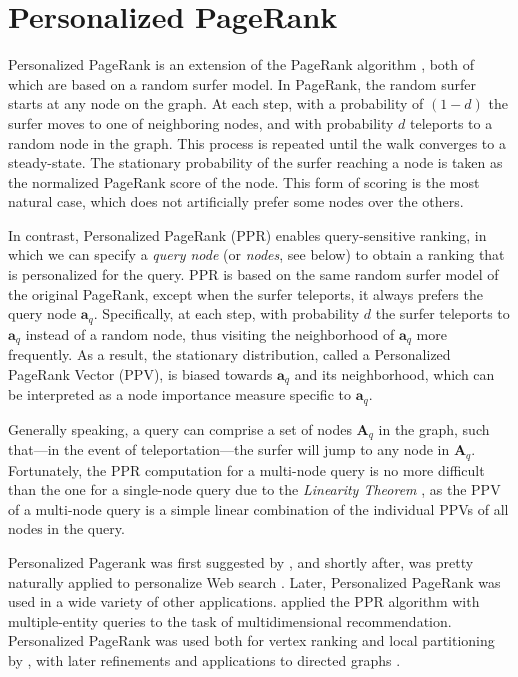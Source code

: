 \documentclass[11pt,oneside]{book}
\let\Oldsection\section
\renewcommand{\section}{\FloatBarrier\Oldsection}
\begin{document}
\section{Personalized PageRank}
Personalized PageRank is an extension of the PageRank algorithm \citep{page1999pagerank}, both of which are based on a random surfer model. In PageRank, the random surfer starts at any node on the graph. At each step, with a probability of $(1-d)$ the surfer moves to one of neighboring nodes, and with probability $d$ teleports to a random node in the graph. This process is repeated until the walk converges to a steady-state. The stationary probability of the surfer reaching a node is taken as the normalized PageRank score of the node. This form of scoring is the most natural case, which does not artificially prefer some nodes over the others.

In contrast, Personalized PageRank (PPR) enables query-sensitive ranking,
in which we can specify a \emph{query node} (or \emph{nodes}, see below) to obtain a ranking that is personalized for the query. PPR is based on the same random surfer model of the original PageRank, except when the surfer teleports, it always prefers the query node $\mathbf{a}_q$. 
Specifically, at each step, with probability $d$ the surfer teleports to $\mathbf{a}_q$ instead of a random node, thus visiting the neighborhood of $\mathbf{a}_q$ more frequently. As a result, the stationary distribution, called a Personalized PageRank Vector (PPV), is biased towards $\mathbf{a}_q$ and its neighborhood, which can be interpreted as a node importance measure specific to $\mathbf{a}_q$.

Generally speaking, a query can comprise a set of nodes $\mathbf{A}_q$ in the
graph, such that---in the event of teleportation---the surfer will jump to any node in $\mathbf{A}_q$. Fortunately, the PPR computation for a multi-node query is no more difficult than the one for a single-node query due to the \textit{Linearity Theorem} \citep{jeh2003scaling}, as the PPV of a multi-node query is a simple linear combination of the individual PPVs of all nodes in the query.


Personalized Pagerank was first suggested by
\cite{brin1998can}, and shortly after, was pretty naturally applied to
personalize Web search
\citep{haveliwala2002topic,haveliwala2003topic,haveliwala2003analytical}. Later, Personalized PageRank was used in a wide variety of other applications. \cite{lee2011random} applied the PPR algorithm with multiple-entity queries to the task of multidimensional recommendation. Personalized PageRank was used both for vertex ranking and local partitioning by \cite{andersen2006local}, with later refinements \citep{andersen2007detecting} and applications to directed graphs \citep{andersen2007local}. 
\end{document}
